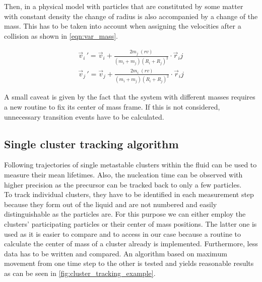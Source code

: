 Then, in a physical model with particles that are constituted by some matter with constant density the change of radius is also accompanied by a change of the mass. This has to be taken into account when assigning the velocities after a collision as shown in \autoref{eqn:var_mass}.

\begin{align}
\label{eqn:var_mass}
\vec{v}_i{\,'} = \vec{v}_i + \frac{2 m_j \; (rv)}{(m_i + m_j) (R_i+R_j)^2} \cdot \vec{r}_ij \nonumber \\
\vec{v}_j{\,'} = \vec{v}_j + \frac{2 m_i \; (rv)}{(m_i + m_j) (R_i+R_j)^2} \cdot \vec{r}_ij
\end{align}

A small caveat is given by the fact that the system with different masses requires a new routine to fix its center of mass frame. If this is not considered, unnecessary transition events have to be calculated.

\subsection{Single cluster tracking algorithm}
\label{sec:tracking}
Following trajectories of single metastable clusters within the fluid can be used to measure their mean lifetimes. Also, the nucleation time can be observed with higher precision as the precursor can be tracked back to only a few particles.\\ 
To track individual clusters, they have to be identified in each measurement step because they form out of the liquid and are not numbered and easily distinguishable as the particles are. For this purpose we can either employ the clusters' participating particles or their center of mass positions. The latter one is used as it is easier to compare and to access in our case because a routine to calculate the center of mass of a cluster already is implemented. Furthermore, less data has to be written and compared. An algorithm based on maximum movement from one time step to the other is tested and yields reasonable results as can be seen in \autoref{fig:cluster_tracking_example}.\\

